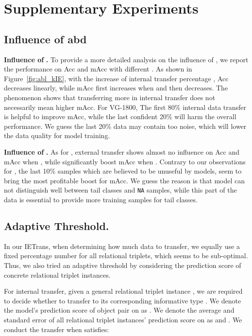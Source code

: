 \documentclass[runningheads]{llncs}
\begin{document}
\section{Supplementary Experiments}
\subsection{Influence of  abd }
\smallskip
\noindent
\textbf{Influence of } \textbf{.}
To provide a more detailed analysis on the influence of , we report the performance on Acc and mAcc with different .
As shown in Figure~\ref{fig:abl_kIE}, with the increase of internal transfer percentage , Acc decreases linearly, while mAcc first increases when  and then decreases.
The phenomenon shows that transferring more in internal transfer does not necessarily mean higher mAcc.
For VG-1800, The first 80\% internal data transfer is helpful to improve mAcc, while the last confident 20\% will harm the overall performance.
We guess the last 20\% data may contain too noise, which will lower the data quality for model training.


\smallskip
\noindent
\textbf{Influence of } \textbf{.}
As for , external transfer shows almost no influence on Acc and mAcc when , while significantly boost mAcc when .
Contrary to our observations for , the last 10\% samples which are believed to be unuseful by models, seem to bring the most profitable boost for mAcc.
We guess the reason is that model can not distinguish well between tail classes and \texttt{NA} samples, while this part of the data is essential to provide more training samples for tail classes.










\subsection{Adaptive Threshold.}
In our IETrans, when determining how much data to transfer, we equally use a fixed percentage number for all relational triplets, which seems to be sub-optimal.
Thus, we also tried an adaptive threshold by considering the prediction score of concrete relational triplet instances.

For internal transfer, given a general relational triplet instance , we are required to decide whether to transfer to its corresponding informative type .
We denote the model's prediction score of object pair   on  as .
We denote the average and standard error of all  relational triplet instances' prediction score on  as  and .
We conduct the transfer when  satisfies:
\end{document}
